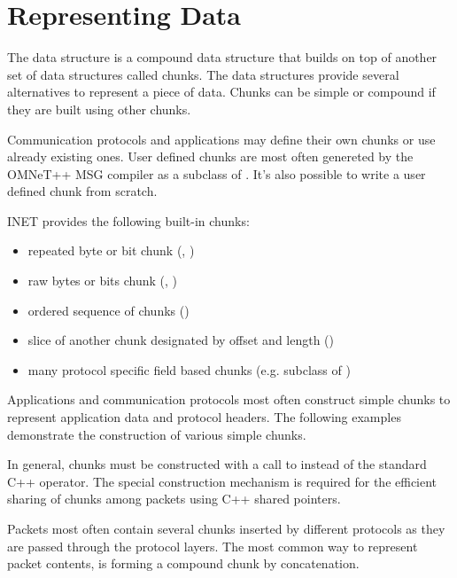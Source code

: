 \section{Representing Data}
\label{sec:packets:representing-data}

The  data structure is a compound data structure that builds on
top of another set of data structures called chunks. The  data
structures provide several alternatives to represent a piece of data. Chunks can
be simple or compound if they are built using other chunks.

Communication protocols and applications may define their own chunks or use
already existing ones. User defined chunks are most often genereted by the
OMNeT++ MSG compiler as a subclass of . It's also
possible to write a user defined chunk from scratch.

INET provides the following built-in chunks:

\begin{itemize}
    \item repeated byte or bit chunk (, )
    \item raw bytes or bits chunk (, )
    \item ordered sequence of chunks ()
    \item slice of another chunk designated by offset and length ()
    \item many protocol specific field based chunks (e.g.  subclass of )
\end{itemize}

Applications and communication protocols most often construct simple chunks to
represent application data and protocol headers. The following examples
demonstrate the construction of various simple chunks.


In general, chunks must be constructed with a call to 
instead of the standard C++  operator. The special construction
mechanism is required for the efficient sharing of chunks among packets using
C++ shared pointers.

Packets most often contain several chunks inserted by different protocols as
they are passed through the protocol layers. The most common way to represent
packet contents, is forming a compound chunk by concatenation.

